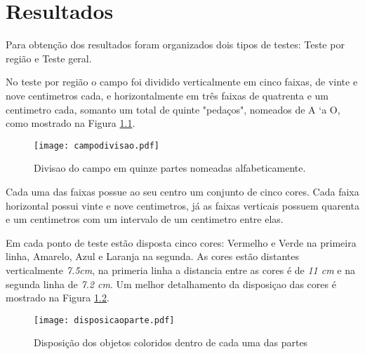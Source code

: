 \chapter{Resultados} 

Para obtenção dos resultados foram organizados dois tipos de testes: Teste por região e
Teste geral.

No teste por região o campo foi dividido verticalmente em cinco faixas, de vinte e nove centimetros cada, e horizontalmente em três faixas de quatrenta e um centimetro cada, somanto um total de quinte "pedaços", nomeados de A `a O, como mostrado na Figura \ref{campodivisao}.

\begin{figure}[!: h]
		\centering
		\texttt{[image: campodivisao.pdf]}
		\caption{Divisao do campo em quinze partes nomeadas alfabeticamente.}
		\label{campodivisao}
	\end{figure}
	
	
 Cada uma das faixas possue ao seu centro um conjunto de cinco cores.
Cada faixa horizontal possui vinte e nove centimetros, já as faixas verticais possuem quarenta e um centimetros com um intervalo de um centimetro entre elas.

Em cada ponto de teste estão disposta cinco cores: Vermelho  e Verde na primeira linha, Amarelo, Azul e Laranja na segunda. As cores estão distantes verticalmente \textit{7.5cm}, na primeria linha a distancia entre as cores é  de \textit{11 cm} e na segunda linha de \textit{7.2 cm}. Um  melhor detalhamento da disposiçao das cores é  mostrado na Figura \ref{disposicaoparte}.

\begin{figure}[!: h]
		\centering
		\texttt{[image: disposicaoparte.pdf]}
		\caption{Disposição dos objetos coloridos dentro de cada uma das partes}
		\label{disposicaoparte}
	\end{figure}
	
